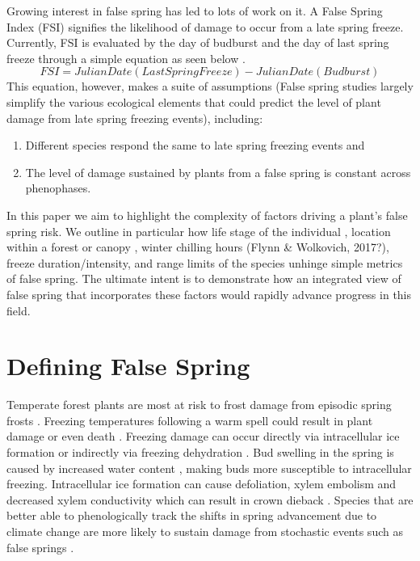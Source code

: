 \documentclass{article}\usepackage[]{graphicx}\usepackage[]{color}
\begin{document}
Growing interest in false spring has led to lots of work on it. A False Spring Index (FSI) signifies the likelihood of damage to occur from a late spring freeze. Currently, FSI is evaluated by the day of budburst and the day of last spring freeze through a simple equation as seen below \citep{Marino2011}.
\begin{equation} \label{eq:1}
FSI = Julian Date (Last Spring Freeze) - Julian Date (Budburst)
\end{equation}
This equation, however, makes a suite of assumptions (False spring studies largely simplify the various ecological elements that could predict the level of plant damage from late spring freezing events), including: 
\begin{enumerate}
\item Different species respond the same to late spring freezing events and \item The level of damage sustained by plants from a false spring is constant across phenophases.
\end{enumerate}

In this paper we aim to highlight the complexity of factors driving a plant's false spring risk. We outline in particular how life stage of the individual \citep{Caffarra2011}, location within a forest or canopy \citep{Augspurger2013}, winter chilling hours (Flynn \& Wolkovich, 2017?), freeze duration/intensity, and range limits of the species \citep{Martin2010} unhinge simple metrics of false spring. The ultimate intent is to demonstrate how an integrated view of false spring that incorporates these factors would rapidly advance progress in this field. 

\section* {Defining False Spring}
Temperate forest plants are most at risk to frost damage from episodic spring frosts \citep{Sakai1987}. Freezing temperatures following a warm spell could result in plant damage or even death \citep{Ludlum1968, Mock2007}. Freezing damage can occur directly via intracellular ice formation or indirectly via freezing dehydration \citep{Pearce2001, Beck2004, Hofmann2015}. Bud swelling in the spring is caused by increased water content \citep{Essiamah1986}, making buds more susceptible to intracellular freezing. Intracellular ice formation can cause defoliation, xylem embolism and decreased xylem conductivity which can result in crown dieback \citep{Gu2008}. Species that are better able to phenologically track the shifts in spring advancement due to climate change are more likely to sustain damage from stochastic events such as false springs \citep{Scheifinger2003}.
\end{document}

